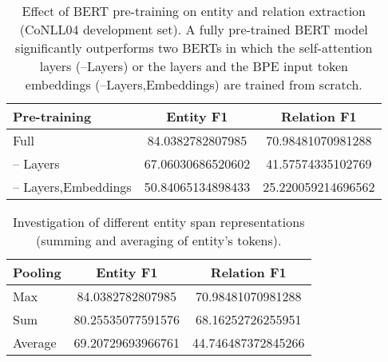 \documentclass{ecai}
\begin{document}
\begin{table}
\centering
\begin{tabular}{l S S}
\toprule
    \textbf{Pre-training} & \textbf{Entity F1} & \textbf{Relation F1} \\ \midrule
    Full & 84.0382782807985 & 70.98481070981288 \\
    -- Layers & 67.06030686520602 & 41.57574335102769 \\
    -- Layers,Embeddings & 50.84065134898433 & 25.220059214696562 \\
\bottomrule
\end{tabular}
\caption{Effect of BERT pre-training on entity and relation extraction (CoNLL04 development set). A fully pre-trained BERT model significantly outperforms two BERTs in which the self-attention layers (--Layers) or the layers and the BPE input token embeddings (--Layers,Embeddings) are trained from scratch.}
\label{table:pretraining} 
\end{table}
\begin{table}
\centering
\begin{tabular}{l S S}
\toprule
    \textbf{Pooling} & \textbf{Entity F1} & \textbf{Relation F1} \\ \midrule
    
    Max & 84.0382782807985 & 70.98481070981288 \\
    Sum & 80.25535077591576 & 68.16252726255951 \\
    Average & 69.20729693966761 & 44.746487372845266 \\
    
\bottomrule
\end{tabular}
\caption{Investigation of different entity span representations  (summing and averaging of entity's tokens).}
\label{table:architecture} 
\end{table}
\end{document}
